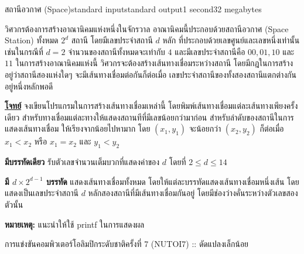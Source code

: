 \documentclass[11pt,a4paper]{article}
\begin{document}
\begin{problem}{สถานีอวกาศ (Space)}{standard input}{standard output}{1 second}{32 megabytes}

วิศวกรต้องการสร้างอาณานิคมแห่งหนึ่งในจักรวาล อาณานิคมนี้ประกอบด้วยสถานีอวกาศ (Space Station) ทั้งหมด $2^d$ สถานี โดยมีเลขประจำสถานี $d$ หลัก ที่ประกอบด้วยเลขศูนย์และเลขหนึ่งเท่านั้น เช่นในกรณีที่ $d = 2$ จำนวนของสถานีทั้งหมดจะเท่ากับ $4$ และมีเลขประจำสถานีคือ $00, 01, 10$ และ $11$ ในการสร้างอาณานิคมแห่งนี้ วิศวกรจะต้องสร้างเส้นทางเชื่อมระหว่างสถานี โดยมีกฎในการสร้างอยู่ว่าสถานีสองแห่งใดๆ จะมีเส้นทางเชื่อมต่อกันก็ต่อเมื่อ เลขประจำสถานีของทั้งสองสถานีแตกต่างกันอยู่หนึ่งหลักพอดี



\bigskip
\underline{\textbf{โจทย์}}  จงเขียนโปรแกรมในการสร้างเส้นทางเชื่อมเหล่านี้ โดยพิมพ์เส้นทางเชื่อมแต่ละเส้นทางเพียงครั้งเดียว สำหรับทางเชื่อมแต่ละทางให้แสดงสถานทีที่มีเลขน้อยกว่ามาก่อน สำหรับลำดับของสถานีในการแสดงเส้นทางเชื่อม ให้เรียงจากน้อยไปหามาก โดย $(x_1,y_1)$ จะน้อยกว่า $(x_2,y_2)$ ก็ต่อเมื่อ  $x_1 < x_2$   หรือ   $x_1 = x_2$ และ $y_1 < y_2$ 


\InputFile

\textbf{มีบรรทัดเดียว} รับตัวเลขจำนวนเต็มบวกที่แสดงค่าของ $d$ โดยที่ $2 \leq d \leq 14$

\OutputFile

\textbf{มี $d \times 2^{d-1}$ บรรทัด} แสดงเส้นทางเชื่อมทั้งหมด โดยให้แต่ละบรรทัดแสดงเส้นทางเชื่อมหนึ่งเส้น โดยแสดงเป็นเลขประจำสถานี $d$ หลักสองสถานีที่มีเส้นทางเชื่อมกันอยู่ โดยมีช่องว่างคั่นระหว่างตัวเลขสองตัวนั้น

\textbf{หมายเหตุ:} แนะนำให้ใช้  printf ในการแสดงผล

\Examples

\begin{example}
%
\end{example}

\begin{example}
%
\end{example}


\Source

การแข่งขันคอมพิวเตอร์โอลิมปิกระดับชาติครั้งที่ 7 (NUTOI7) :: ดัดแปลงเล็กน้อย

\end{problem}
\end{document}
